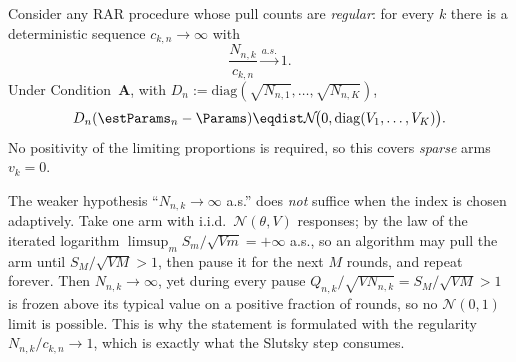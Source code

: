 \begin{lemma}\label{lem:componentwise}
\leanok
{}
Consider any RAR procedure whose pull counts are \emph{regular}: for every $k$ there is a
deterministic sequence $c_{k,n}\to\infty$ with
\[
  \frac{N_{n,k}}{c_{k,n}}\xrightarrow{a.s.}1 .
\]
Under Condition~\textbf{A}, with $D_n := \mathrm{diag}(\sqrt{N_{n,1}},\dots,\sqrt{N_{n,K}})$,
\[
  D_n(\estParams_n - \Params) \eqdist \mathcal{N}\!\big(0, \mathrm{diag}(V_1,\dots,V_K)\big).
\]
No positivity of the limiting proportions is required, so this covers \emph{sparse} arms $v_k=0$.
\end{lemma}

\begin{remark}\label{rem:componentwise_regularity}
The weaker hypothesis ``$N_{n,k}\to\infty$ a.s.'' does \emph{not} suffice when the index is chosen
adaptively. Take one arm with i.i.d.\ $\mathcal N(\theta,V)$ responses; by the law of the iterated
logarithm $\limsup_m S_m/\sqrt{Vm}=+\infty$ a.s., so an algorithm may pull the arm until
$S_M/\sqrt{VM}>1$, then pause it for the next $M$ rounds, and repeat forever. Then
$N_{n,k}\to\infty$, yet during every pause $Q_{n,k}/\sqrt{V N_{n,k}}=S_M/\sqrt{VM}>1$ is frozen
above its typical value on a positive fraction of rounds, so no $\mathcal N(0,1)$ limit is possible.
This is why the statement is formulated with the regularity $N_{n,k}/c_{k,n}\to1$, which is exactly
what the Slutsky step consumes.
\end{remark}

